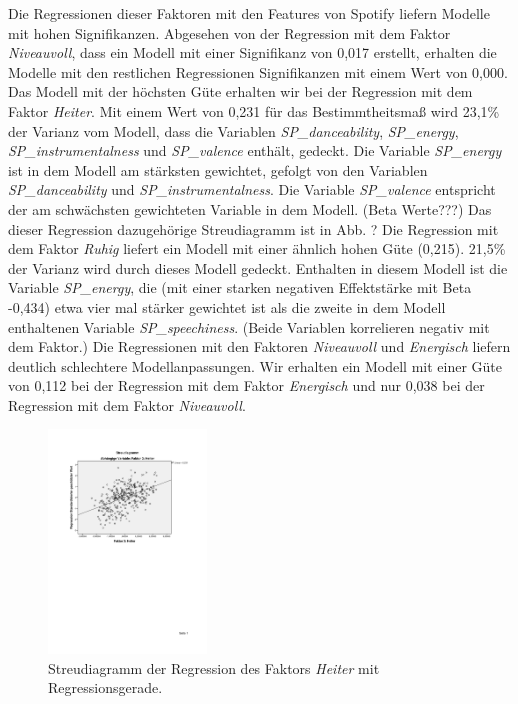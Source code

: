 Die Regressionen dieser Faktoren mit den Features von Spotify liefern Modelle mit hohen Signifikanzen. Abgesehen von der Regression mit dem Faktor \textit{Niveauvoll}, dass ein Modell mit einer Signifikanz von 0,017 erstellt, erhalten die Modelle mit den restlichen Regressionen Signifikanzen mit einem Wert von 0,000. 
Das Modell mit der höchsten Güte erhalten wir bei der Regression mit dem Faktor \textit{Heiter}.
Mit einem Wert von 0,231 für das Bestimmtheitsmaß wird 23,1\% der Varianz vom Modell, dass die Variablen \textit{SP\_danceability}, \textit{SP\_energy}, \textit{SP\_instrumentalness} und \textit{SP\_valence} enthält, gedeckt.
Die Variable \textit{SP\_energy} ist in dem Modell am stärksten gewichtet, gefolgt von den Variablen \textit{SP\_danceability} und \textit{SP\_instrumentalness}. Die Variable \textit{SP\_valence} entspricht der am schwächsten gewichteten Variable in dem Modell. (Beta Werte???)
Das dieser Regression dazugehörige Streudiagramm ist in Abb. ?   
Die Regression mit dem Faktor \textit{Ruhig} liefert ein Modell mit einer ähnlich hohen Güte (0,215).
21,5\% der Varianz wird durch dieses Modell gedeckt.
Enthalten in diesem Modell ist die Variable \textit{SP\_energy}, die (mit einer starken negativen Effektstärke mit Beta -0,434) etwa vier mal stärker gewichtet ist als die zweite in dem Modell enthaltenen Variable \textit{SP\_speechiness}.
(Beide Variablen korrelieren negativ mit dem Faktor.) 
Die  Regressionen mit den Faktoren \textit{Niveauvoll} und \textit{Energisch} liefern deutlich schlechtere Modellanpassungen.
Wir erhalten ein Modell mit einer Güte von 0,112 bei der Regression mit dem Faktor \textit{Energisch} und nur 0,038 bei der Regression mit dem Faktor \textit{Niveauvoll}.


\begin{figure}[hbt]
    \begin{center}
        \includegraphics[width=4.2cm]{images/StreudiagrammFak3.pdf}
    \end{center}
    \caption{Streudiagramm der Regression des Faktors \textit{Heiter} mit Regressionsgerade.}
    \label{fig:Faktor3}
\end{figure}


